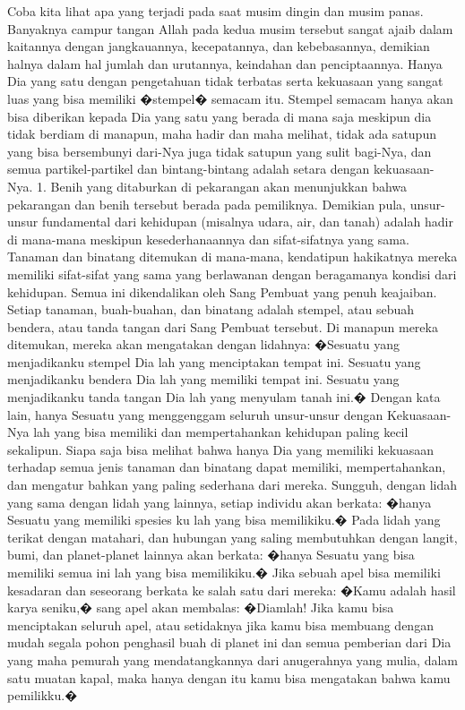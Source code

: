 \documentclass[]{article}
\begin{document}
Coba kita lihat apa yang terjadi pada saat musim dingin dan musim panas. Banyaknya campur tangan Allah pada kedua musim tersebut sangat ajaib dalam kaitannya dengan jangkauannya, kecepatannya, dan kebebasannya, demikian halnya dalam hal jumlah dan urutannya, keindahan dan penciptaannya. Hanya Dia yang satu dengan pengetahuan tidak terbatas  serta kekuasaan yang sangat luas yang bisa memiliki �stempel�  semacam itu. Stempel semacam hanya akan bisa diberikan kepada Dia yang satu yang berada di mana saja meskipun dia tidak berdiam di manapun, maha hadir dan maha melihat, tidak ada satupun yang bisa bersembunyi dari-Nya juga tidak satupun yang sulit bagi-Nya, dan semua partikel-partikel dan bintang-bintang adalah setara dengan kekuasaan-Nya. 
1.  Benih yang ditaburkan di pekarangan akan menunjukkan bahwa pekarangan dan benih tersebut berada pada pemiliknya. Demikian pula, unsur-unsur fundamental dari kehidupan (misalnya udara, air, dan tanah) adalah hadir di mana-mana meskipun kesederhanaannya dan sifat-sifatnya yang sama. Tanaman dan binatang ditemukan di mana-mana, kendatipun hakikatnya mereka memiliki sifat-sifat yang sama yang berlawanan dengan beragamanya kondisi dari kehidupan.
Semua ini dikendalikan oleh Sang Pembuat yang penuh keajaiban. Setiap tanaman, buah-buahan, dan binatang adalah stempel, atau sebuah bendera, atau tanda tangan dari Sang Pembuat tersebut. Di manapun mereka ditemukan, mereka akan mengatakan dengan lidahnya: �Sesuatu yang menjadikanku stempel Dia lah yang menciptakan tempat ini. Sesuatu yang menjadikanku bendera Dia lah yang memiliki tempat ini. Sesuatu yang menjadikanku tanda tangan Dia lah yang menyulam tanah ini.� Dengan kata lain, hanya Sesuatu yang menggenggam seluruh unsur-unsur dengan Kekuasaan-Nya lah yang bisa memiliki dan mempertahankan kehidupan paling kecil sekalipun. Siapa saja bisa melihat bahwa hanya Dia yang memiliki kekuasaan terhadap semua jenis tanaman dan binatang dapat memiliki, mempertahankan, dan mengatur bahkan yang paling sederhana dari mereka. 
Sungguh, dengan lidah yang sama dengan lidah yang lainnya, setiap individu akan berkata: �hanya Sesuatu yang memiliki spesies ku lah yang bisa memilikiku.� Pada lidah yang terikat dengan matahari, dan hubungan yang saling membutuhkan dengan langit, bumi, dan planet-planet lainnya akan berkata: �hanya Sesuatu yang bisa memiliki semua ini lah yang bisa memilikiku.� Jika sebuah apel bisa memiliki kesadaran dan seseorang berkata ke salah satu dari mereka: �Kamu adalah hasil karya seniku,� sang apel akan membalas: �Diamlah! Jika kamu bisa menciptakan seluruh apel, atau setidaknya jika kamu bisa membuang dengan mudah segala pohon penghasil buah di planet ini dan semua pemberian dari Dia yang maha pemurah yang mendatangkannya dari anugerahnya yang mulia, dalam satu muatan kapal, maka hanya dengan itu kamu bisa mengatakan bahwa kamu pemilikku.� 
\end{document}
